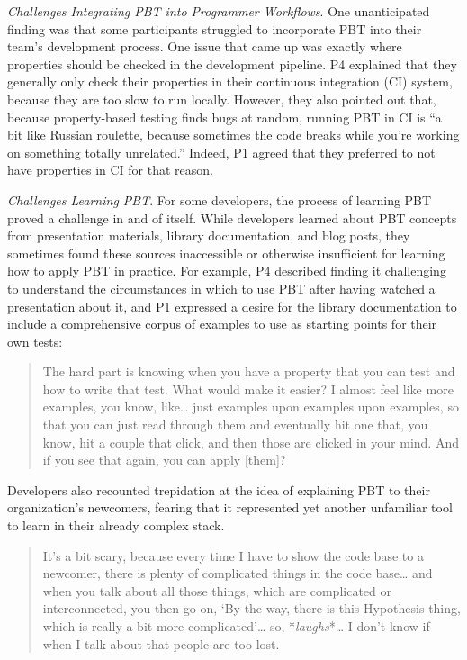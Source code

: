 \textit{Challenges Integrating PBT into Programmer Workflows}.
One unanticipated finding was that some participants struggled to incorporate
PBT into their team's development process. One issue
that came up was exactly where properties should be checked in the development pipeline.
P4 explained that they generally only check their properties in their
continuous integration (CI) system, because they are too slow to run locally.
However, they also pointed out that, because property-based testing finds
bugs at random, running PBT in CI is ``a bit like
Russian roulette, because sometimes the code breaks while you're working on
something totally unrelated.'' Indeed, P1 agreed that they preferred
to not have properties in CI for that reason.

\textit{Challenges Learning PBT}.
For some developers, the process of learning PBT proved a challenge in and of
itself.  While developers learned about PBT concepts from presentation
materials, library documentation, and blog posts, they sometimes found these
sources inaccessible or otherwise insufficient for learning how to apply PBT in practice.
For example, P4 described finding it challenging to understand the circumstances
in which to use PBT after having watched a presentation about it, and P1
expressed a desire for the library documentation to
include a comprehensive corpus of examples to use as starting points for their own tests:
\begin{quote}
  The hard part is knowing when you
  have a property that you can test and how to write that test. What
  would make it easier? I almost feel like more examples, you know,
  like\ldots{} just examples upon examples upon examples, so that you can just
  read through them and eventually hit one that, you know, hit a
  couple that click, and then those are clicked in your mind. And if you see
  that again, you can apply [them]?
\end{quote}

Developers also recounted trepidation at the idea of explaining PBT to
their organization's newcomers, fearing that it represented yet another unfamiliar
tool to learn in their already complex stack.
\begin{quote}
It's a bit scary, because every time I have to show the code base to a newcomer,
there is plenty of complicated things in the code base\ldots{} and when you
talk about all those things, which are complicated or interconnected, you
then go on, `By the way, there is this Hypothesis thing, which is really
a bit more complicated'\ldots{} so, *\emph{laughs}*\ldots{} I don't know if
when I talk about that people are too lost.
\end{quote}

